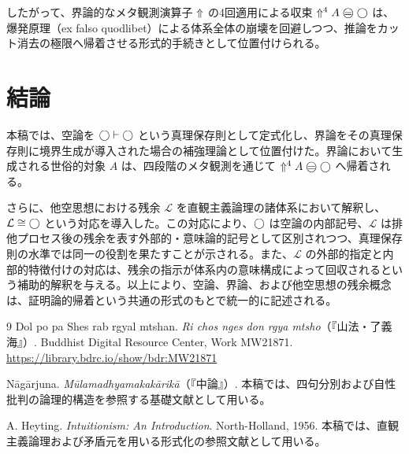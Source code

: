 \documentclass[11pt,a4paper]{article}
\newcommand{\lhagma}{\mathcal{L}}
\newcommand{\rupa}{A} %
\theoremstyle{definition}
\begin{document}
したがって、界論的なメタ観測演算子 $\Uparrow$ の4回適用による収束 $\metanegation^4 \rupa \mweq \dfix$ は、爆発原理（ex falso quodlibet）による体系全体の崩壊を回避しつつ、推論をカット消去の極限へ帰着させる形式的手続きとして位置付けられる。

\section{結論}

本稿では、空論を $\bigcirc \vdash \bigcirc$ という真理保存則として定式化し、界論をその真理保存則に境界生成が導入された場合の補強理論として位置付けた。界論において生成される世俗的対象 $\rupa$ は、四段階のメタ観測を通じて $\metanegation^4 \rupa \mweq \dfix$ へ帰着される。

さらに、他空思想における残余 $\lhagma$ を直観主義論理の諸体系において解釈し、$\lhagma \cong \dfix$ という対応を導入した。この対応により、$\bigcirc$ は空論の内部記号、$\lhagma$ は排他プロセス後の残余を表す外部的・意味論的記号として区別されつつ、真理保存則の水準では同一の役割を果たすことが示される。また、$\lhagma$ の外部的指定と内部的特徴付けの対応は、残余の指示が体系内の意味構成によって回収されるという補助的解釈を与える。以上により、空論、界論、および他空思想の残余概念は、証明論的帰着という共通の形式のもとで統一的に記述される。


\begin{thebibliography}{9}
Dol po pa Shes rab rgyal mtshan.
\textit{Ri chos nges don rgya mtsho}（『山法・了義海』）.
Buddhist Digital Resource Center, Work MW21871.
\url{https://library.bdrc.io/show/bdr:MW21871}

N\=ag\=arjuna.
\textit{M\=ulamadhyamakak\=arik\=a}（『中論』）.
本稿では、四句分別および自性批判の論理的構造を参照する基礎文献として用いる。

A. Heyting.
\textit{Intuitionism: An Introduction}.
North-Holland, 1956.
本稿では、直観主義論理および矛盾元を用いる形式化の参照文献として用いる。
\end{thebibliography}
\end{document}
